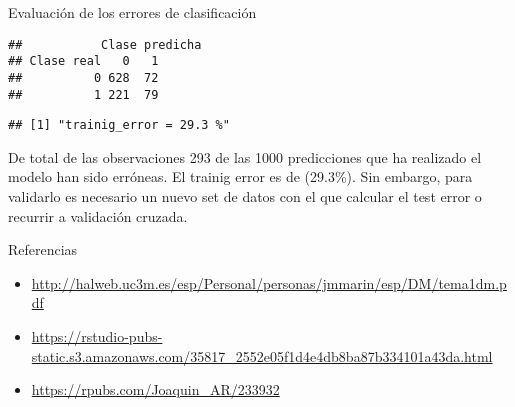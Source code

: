 \documentclass[ignorenonframetext,]{beamer}
\newenvironment{Shaded}{\begin{snugshade}}{\end{snugshade}}
\newcommand{\KeywordTok}[1]{\textcolor[rgb]{0.13,0.29,0.53}{\textbf{#1}}}
\newcommand{\DataTypeTok}[1]{\textcolor[rgb]{0.13,0.29,0.53}{#1}}
\newcommand{\DecValTok}[1]{\textcolor[rgb]{0.00,0.00,0.81}{#1}}
\newcommand{\StringTok}[1]{\textcolor[rgb]{0.31,0.60,0.02}{#1}}
\newcommand{\OperatorTok}[1]{\textcolor[rgb]{0.81,0.36,0.00}{\textbf{#1}}}
\newcommand{\NormalTok}[1]{#1}
\begin{document}
\begin{frame}[fragile]{Evaluación de los errores de clasificación}

\hypertarget{left}{}
\begin{verbatim}
##           Clase predicha
## Clase real   0   1
##          0 628  72
##          1 221  79
\end{verbatim}

\begin{verbatim}
## [1] "trainig_error = 29.3 %"
\end{verbatim}

De total de las observaciones 293 de las 1000 predicciones que ha
realizado el modelo han sido erróneas. El trainig error es de (29.3\%).
Sin embargo, para validarlo es necesario un nuevo set de datos con el
que calcular el test error o recurrir a validación cruzada.

\hypertarget{right}{}
\begin{Shaded}
\end{Shaded}

\end{frame}

\begin{frame}{Referencias}

\begin{itemize}
\item
  \url{http://halweb.uc3m.es/esp/Personal/personas/jmmarin/esp/DM/tema1dm.pdf}
\item
  \url{https://rstudio-pubs-static.s3.amazonaws.com/35817_2552e05f1d4e4db8ba87b334101a43da.html}
\item
  \url{https://rpubs.com/Joaquin_AR/233932}
\end{itemize}

\end{frame}
\end{document}

